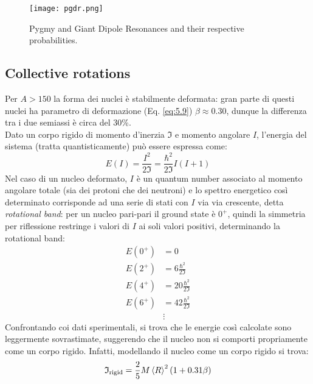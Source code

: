 \begin{figure}[!t]
	\centering
	\texttt{[image: pgdr.png]}
	\caption{Pygmy and Giant Dipole Resonances and their respective probabilities.}
	\label{pgdr}
\end{figure}

\subsection{Collective rotations}

Per $ A > 150 $ la forma dei nuclei è stabilmente deformata: gran parte di questi nuclei ha parametro di deformazione (Eq. \ref{eq:5.9}) $ \beta \approx 0.30 $, dunque la differenza tra i due semiassi è circa del 30\%.\\
Dato un corpo rigido di momento d'inerzia $ \mathfrak{I} $ e momento angolare $ I $, l'energia del sistema (tratta quantisticamente) può essere espressa come:
\begin{equation}
	E(I) = \frac{I^2}{2\mathfrak{I}} = \frac{\hbar^2}{2\mathfrak{I}} I (I + 1)
	\label{eq:5.12}
\end{equation}
Nel caso di un nucleo deformato, $ I $ è un quantum number associato al momento angolare totale (sia dei protoni che dei neutroni) e lo spettro energetico così determinato corrisponde ad una serie di stati con $ I $ via via crescente, detta \textit{rotational band}: per un nucleo pari-pari il ground state è $ 0^+ $, quindi la simmetria per riflessione restringe i valori di $ I $ ai soli valori positivi, determinando la rotational band:
\begin{equation*}
	\begin{split}
		E(0^+) &= 0 \\
		E(2^+) &= 6 \frac{\hbar^2}{2\mathfrak{I}} \\
		E(4^+) &= 20 \frac{\hbar^2}{2\mathfrak{I}} \\
		E(6^+) &= 42 \frac{\hbar^2}{2\mathfrak{I}} \\
		       &\vdots
	\end{split}
\end{equation*}
Confrontando coi dati sperimentali, si trova che le energie così calcolate sono leggermente sovrastimate, suggerendo che il nucleo non si comporti propriamente come un corpo rigido. Infatti, modellando il nucleo come un corpo rigido si trova:
\begin{equation}
	\mathfrak{I}_{\text{rigid}} = \frac{2}{5} M \braket{R}^2 (1 + 0.31 \beta)
	\label{eq:5.13}
\end{equation}
